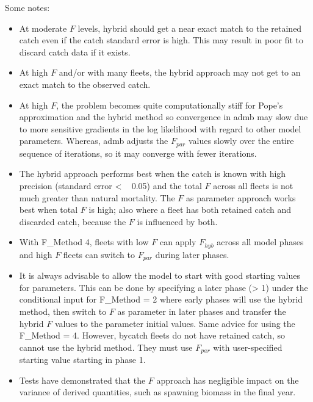 Some notes:
\begin{itemize}
	\item At moderate $F$ levels, hybrid should get a near exact match to the retained catch even if the catch standard error is high. This may result in poor fit to discard catch data if it exists.
	\item At high $F$ and/or with many fleets, the hybrid approach may not get to an exact match to the observed catch.
	\item At high $F$, the problem becomes quite computationally stiff for Pope’s approximation and the hybrid method so convergence in \gls{admb} may slow due to more sensitive gradients in the log likelihood with regard to other model parameters. Whereas, \gls{admb} adjusts the $F_{par}$ values slowly over the entire sequence of iterations, so it may converge with fewer iterations.
	\item The hybrid approach performs best when the catch is known with high precision (standard error < ~ 0.05) and the total $F$ across all fleets is not much greater than natural mortality. The $F$ as parameter approach works best when total $F$ is high; also where a fleet has both retained catch and discarded catch, because the $F$ is influenced by both. 
	\item With F\_Method 4, fleets with low $F$ can apply $F_{hyb}$ across all model phases and high $F$ fleets can switch to $F_{par}$ during later phases.
	\item It is always advisable to allow the model to start with good starting values for parameters. This can be done by specifying a later phase (> 1) under the conditional input for F\_Method = 2 where early phases will use the hybrid method, then switch to $F$ as parameter in later phases and transfer the hybrid $F$ values to the parameter initial values. Same advice for using the F\_Method = 4. However, bycatch fleets do not have retained catch, so cannot use the hybrid method. They must use $F_{par}$ with user-specified starting value starting in phase 1.
	\item Tests have demonstrated that the $F$ approach has negligible impact on the variance of derived quantities, such as spawning biomass in the final year.

\end{itemize}
